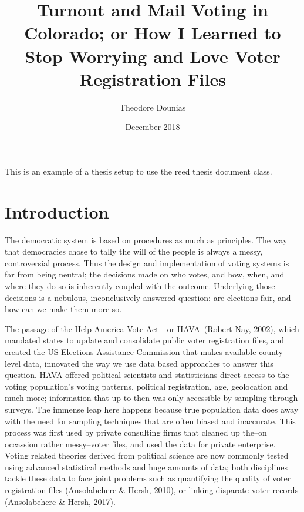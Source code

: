 \documentclass[12pt,twoside]{reedthesis}
\title{Turnout and Mail Voting in Colorado; or How I Learned to Stop Worrying
and Love Voter Registration Files}
\author{Theodore Dounias}
\date{December 2018}
\begin{document}
      \maketitle
  
  \frontmatter %
  \pagestyle{empty} %

  
      \begin{preface}
      This is an example of a thesis setup to use the reed thesis document
      class.
    \end{preface}
  
      \hypersetup{linkcolor=black}
    \setcounter{tocdepth}{3}
    \tableofcontents
  
      \listoftables
  
      \listoffigures
  
  
  
  \mainmatter %
  \pagestyle{fancyplain} %

  \chapter*{Introduction}\label{introduction}
  
  The democratic system is based on procedures as much as principles. The
  way that democracies chose to tally the will of the people is always a
  messy, controversial process. Thus the design and implementation of
  voting systems is far from being neutral; the decisions made on who
  votes, and how, when, and where they do so is inherently coupled with
  the outcome. Underlying those decisions is a nebulous, inconclusively
  answered question: are elections fair, and how can we make them more so.
  
  The passage of the Help America Vote Act---or HAVA--(Robert Nay, 2002),
  which mandated states to update and consolidate public voter
  registration files, and created the US Elections Assistance Commission
  that makes available county level data, innovated the way we use data
  based approaches to answer this question. HAVA offered political
  scientists and statisticians direct access to the voting population's
  voting patterns, political registration, age, geolocation and much more;
  information that up to then was only accessible by sampling through
  surveys. The immense leap here happens because true population data does
  away with the need for sampling techniques that are often biased and
  inaccurate. This process was first used by private consulting firms that
  cleaned up the--on occassion rather messy--voter files, and used the
  data for private enterprise. Voting related theories derived from
  political science are now commonly tested using advanced statistical
  methods and huge amounts of data; both disciplines tackle these data to
  face joint problems such as quantifying the quality of voter
  registration files (Ansolabehere \& Hersh, 2010), or linking disparate
  voter records (Ansolabehere \& Hersh, 2017).
  
\end{document}
